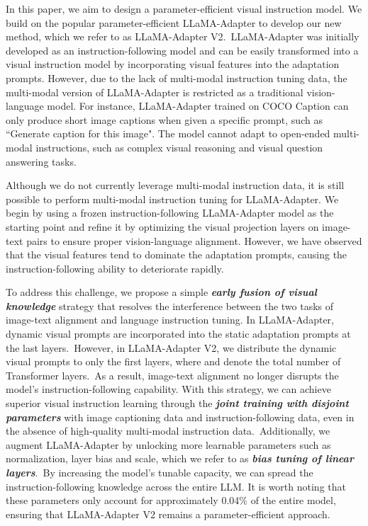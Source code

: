 \documentclass[10pt,twocolumn,letterpaper]{article}
\begin{document}
In this paper, we aim to design a parameter-efficient visual instruction model. We build on the popular parameter-efficient LLaMA-Adapter to develop our new method, which we refer to as LLaMA-Adapter V2.~LLaMA-Adapter was initially developed as an instruction-following model and can be easily transformed into a visual instruction model by incorporating visual features into the adaptation prompts. However, due to the lack of multi-modal instruction tuning data, the multi-modal version of LLaMA-Adapter is restricted as a traditional vision-language model. For instance, LLaMA-Adapter trained on COCO Caption \cite{chen2015microsoft} can only produce short image captions when given a specific prompt, such as ``Generate caption for this image". The model cannot adapt to open-ended multi-modal instructions, such as complex visual reasoning and visual question answering tasks.



Although we do not currently leverage multi-modal instruction data, it is still possible to perform multi-modal instruction tuning for LLaMA-Adapter. We begin by using a frozen instruction-following LLaMA-Adapter model as the starting point and refine it by optimizing the visual projection layers on image-text pairs to ensure proper vision-language alignment. However, we have observed that the visual features tend to dominate the adaptation prompts, causing the instruction-following ability to deteriorate rapidly.

To address this challenge, we propose a simple \textbf{\textit{early fusion of visual knowledge}} strategy that resolves the interference between the two tasks of image-text alignment and language instruction tuning. In LLaMA-Adapter, dynamic visual prompts are incorporated into the static adaptation prompts at the last  layers.~However, in LLaMA-Adapter V2, we distribute the dynamic visual prompts to only the first  layers, where  and  denote the total number of Transformer layers.~As a result, image-text alignment no longer disrupts the model's instruction-following capability. 
With this strategy, we can achieve superior visual instruction learning through the \textbf{\textit{joint training with disjoint parameters}} with image captioning data and instruction-following data, even in the absence of high-quality multi-modal instruction data.~Additionally, we augment LLaMA-Adapter by unlocking more learnable parameters such as normalization, layer bias and scale, which we refer to as \textbf{\textit{bias tuning of linear layers}}.~By increasing the model's tunable capacity, we can spread the instruction-following knowledge across the entire LLM. It is worth noting that these parameters only account for approximately 0.04\% of the entire model, ensuring that LLaMA-Adapter V2 remains a parameter-efficient approach.
\end{document}
